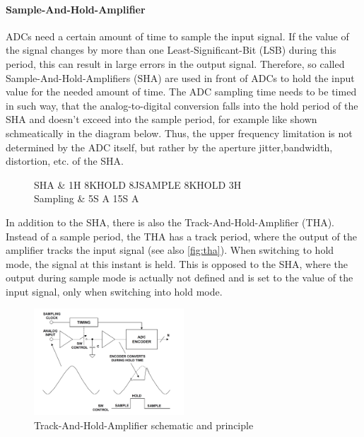 \paragraph{Sample-And-Hold-Amplifier}
ADCs need a certain amount of time to sample the input signal. If the value of the signal changes by more than one Least-Significant-Bit (LSB) during this period, this can result in large errors in the output signal. Therefore, so called Sample-And-Hold-Amplifiers (SHA) are used in front of ADCs to hold the  input value for the needed amount of time. The ADC sampling time needs to be timed in such way, that the analog-to-digital conversion falls into the hold period of the SHA and doesn't exceed into the sample period, for example like shown schmeatically in the diagram below. Thus, the upper frequency limitation is not determined by the ADC itself, but rather by the aperture jitter,bandwidth, distortion, etc. of the SHA. \cite{walt}



\begin{figure} [H]
	\centering
	\tikzexternaldisable
	\begin{tikztimingtable}
		[%
		timing/dslope=0.1,
		timing/name/.style={font=\sffamily\normalsize},
		timing/d/text/.style={font=\sffamily\normalsize},
		grayz/.style={timing/z/.append style={gray}},
		timing/n/.style={rectangle},
		timing/metachar={{K}[2]{#1l !{++(0,+.5\yunit)} N[rectangle,scale=.6]{\shortstack{#2}} !{++(0,-.5\yunit)} #1l}},
		timing/metachar={{J}[2]{#1h !{++(0,-.5\yunit)} N[rectangle,scale=.6]{\shortstack{#2}} !{++(0,+.5\yunit)} #1h}},
		]
		SHA & 1H 8K{HOLD} 8J{SAMPLE} 8K{HOLD} 3H\\
		Sampling & 5S A 15S A                    \\
	\end{tikztimingtable}
	\tikzexternalenable
\end{figure}

In addition to the SHA, there is also the Track-And-Hold-Amplifier (THA). Instead of a sample period, the THA has a track period, where the output of the amplifier tracks the input signal (see also \autoref{fig:tha}). When switching to hold mode, the signal at this instant is held. This is opposed to the SHA, where the output during sample mode is actually not defined and is set to the value of the input signal, only when switching into hold mode. 

\begin{figure}[H]
	\centering
	\includegraphics[width = 0.5\textwidth]{chap/02-theory/img/tha}
	\caption{Track-And-Hold-Amplifier schematic and principle \cite{walt}}
	\label{fig:tha}
\end{figure}

